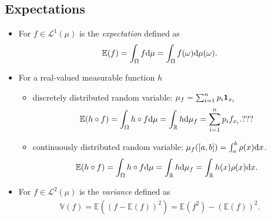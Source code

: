 \documentclass[oneside,11pt]{book}
\numberwithin{equation}{section}
\begin{document}
\subsection{Expectations}
\begin{itemize}
    \item For $f\in\mathcal{L}^1(\mu)$ is the \textit{expectation} defined as
    \begin{align*}
        \mathbb{E}(f) = \int_\Omega f{\rm d}\mu = \int_\Omega f(\omega){\rm d}\mu(\omega).
    \end{align*}
    \item For a real-valued measurable function $h$
    \begin{itemize}
        \item discretely distributed random variable: $\mu_f = \sum_{i=1}^n p_i{\bf 1}_{x_i}$
        \begin{align*}
            \mathbb{E}(h\circ f) = \int_\Omega h\circ f{\rm d}\mu = \int_\mathbb{R} h{\rm d}\mu_f = \sum_{i=1}^n p_if_{x_i}.???
        \end{align*}
        \item continuously distributed random variable: $\mu_f([a,b]) = \int_a^b \rho(x){\rm d}x$.
        \begin{align*}
            \mathbb{E}(h\circ f) = \int_\Omega h\circ f{\rm d}\mu = \int_\mathbb{R} h{\rm d}\mu_f = \int_\mathbb{R} h(x)\rho(x){\rm d}x.
        \end{align*}
    \end{itemize}
    \item For $f\in\mathcal{L}^2(\mu)$ is the \textit{variance} defined as
    \begin{align*}
        \mathbb{V}(f) = \mathbb{E}((f - \mathbb{E}(f))^2) = \mathbb{E}(f^2) - (\mathbb{E}(f))^2.
    \end{align*}
\end{itemize}
\end{document}
